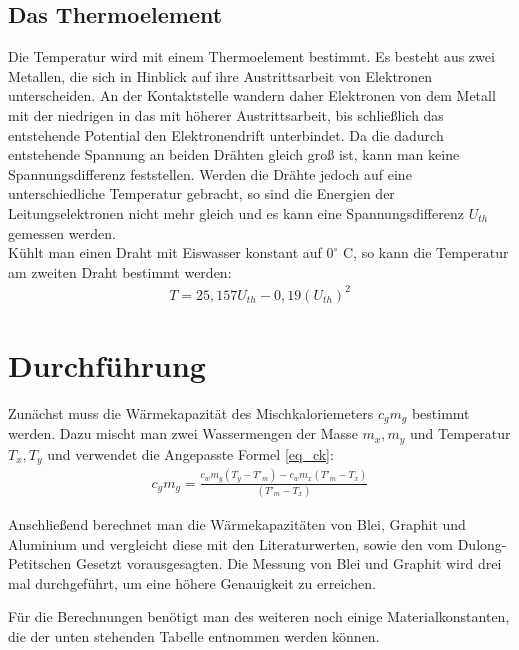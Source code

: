 \subsection{Das Thermoelement}
Die Temperatur wird mit einem Thermoelement bestimmt. Es besteht aus zwei Metallen, die sich in Hinblick auf ihre Austrittsarbeit von Elektronen unterscheiden. An der Kontaktstelle wandern daher Elektronen von dem Metall mit der niedrigen in das mit höherer Austrittsarbeit, bis schließlich das entstehende Potential den Elektronendrift unterbindet. Da die dadurch entstehende Spannung an beiden Drähten gleich groß ist, kann man keine Spannungsdifferenz feststellen. Werden die Drähte jedoch auf eine unterschiedliche Temperatur gebracht, so sind die Energien der Leitungselektronen nicht mehr gleich und es kann eine Spannungsdifferenz $U_{th}$ gemessen werden.\\
Kühlt man einen Draht mit Eiswasser konstant auf $0^\circ$ C, so kann die Temperatur am zweiten Draht bestimmt werden:
\begin{align}
T= 25,157 U_{th} -0,19 (U_{th})^2
\label{eq_temp}
\end{align} 


\section{Durchführung}
Zunächst muss die Wärmekapazität des Mischkaloriemeters $c_gm_g$ bestimmt werden. Dazu mischt man zwei Wassermengen der Masse $m_x, m_y$ und Temperatur $T_x, T_y$ und verwendet die Angepasste Formel \eqref{eq_ck}:
\begin{align}
c_gm_g = \frac{c_wm_y\left(T_y-T'_m\right) - c_wm_x\left(T'_m-T_x\right)}{\left( T'_m -T_x\right)}
\label{eq_cgmg}
\end{align}

Anschließend berechnet man die Wärmekapazitäten von Blei, Graphit und Aluminium und vergleicht diese mit den Literaturwerten, sowie den vom Dulong-Petitschen Gesetzt vorausgesagten. Die Messung von Blei und Graphit wird drei mal durchgeführt, um eine höhere Genauigkeit zu erreichen.

Für die Berechnungen benötigt man des weiteren noch einige Materialkonstanten, die der unten stehenden Tabelle entnommen werden können.\\


